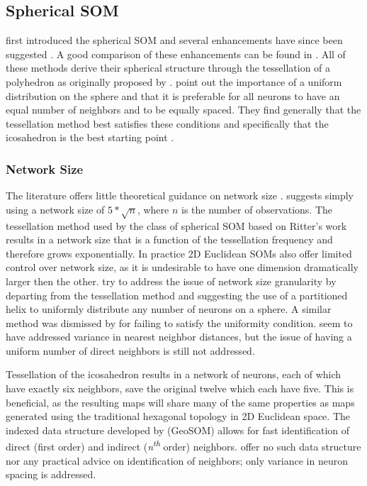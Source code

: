 \documentclass[11pt]{article}
\begin{document}
\subsection{Spherical SOM}
\cite{ritter99} first introduced the spherical SOM and several
enhancements have since been suggested 
\citep{Wu:2006lr,boudjemai2003,sangole03,Nishio:2006fk}.  A good
comparison of these enhancements can be found in \citep{Wu:2006lr}.  All of
these methods derive their spherical structure through the tessellation of a
polyhedron as originally proposed by \citeauthor{ritter99}.  \cite{Wu:2006lr}
point out the importance of a uniform distribution on the sphere and that it is
preferable for all neurons to have an equal number of neighbors and to be
equally spaced.  They find generally that the tessellation method best
satisfies these conditions and specifically that the icosahedron is the best
starting point \citep{wu2005}.

\subsubsection{Network Size}
The literature offers little theoretical guidance on network size
\citep{cho1996}.  \cite{toolbox} suggests simply using a network
size of \(5*\sqrt {n}\), where \(n\) is the number of observations.
The tessellation method used by the class of spherical SOM
based on Ritter's work results in a network size that is a function of the
tessellation frequency and therefore grows exponentially. In practice 2D
Euclidean SOMs also offer limited control over network size, as it is
undesirable to have one dimension dramatically larger then the other.
\cite{Nishio:2006fk} try to address the issue of network size granularity by
departing from the tessellation method and suggesting the use of a partitioned
helix to uniformly distribute any number of neurons on a sphere.  A similar
method was dismissed by \cite{wu2005} for failing to satisfy the uniformity
condition.  \citeauthor{Nishio:2006fk} seem to have addressed variance in 
nearest neighbor distances, but the issue of having a uniform number of direct
neighbors is still not addressed.

Tessellation of the icosahedron results in a network of neurons, each of which
have exactly six neighbors, save the original twelve which each have five.
This is beneficial, as the resulting maps will share many of the same
properties as maps generated using the traditional hexagonal topology in 2D
Euclidean space. The indexed data structure developed by
\citeauthor{Wu:2006lr} (GeoSOM) allows for fast identification of direct
(first order) and indirect (\textit{n\textsuperscript{th}} order) neighbors.
\cite{Nishio:2006fk} offer no such data structure nor any practical advice on
identification of neighbors; only variance in neuron spacing is addressed.
\end{document}
